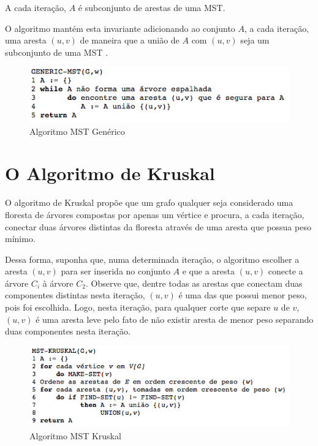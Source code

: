 \documentclass[12pt]{article}
\begin{document}
	A cada iteração, $A$ é subconjunto de arestas de uma MST. 
	
	O algoritmo mantém esta invariante adicionando ao conjunto $A$, a cada iteração, uma aresta $(u,v)$ de maneira que a união de $A$ com $(u,v)$ seja um subconjunto de uma MST \cite{paulo:15}.
\begin{figure}[ht]
    \centering
    \includegraphics[width=1\textwidth]{imagens/generic_mst.png}
    \caption{Algoritmo MST Genérico}
\end{figure}



\section{O Algoritmo de Kruskal}
O algoritmo de Kruskal propõe que um grafo qualquer seja considerado uma floresta de árvores compostas por apenas um vértice e procura, a cada iteração, conectar duas árvores distintas da floresta através de uma aresta que possua peso mínimo.

Dessa forma, suponha que, numa determinada iteração, o algoritmo escolher a aresta $(u,v)$ para ser inserida no conjunto $A$ e que a aresta $(u,v)$ conecte a árvore $C_i$ à árvore $C_2$. Observe que, dentre todas as arestas que conectam duas componentes distintas nesta iteração, $(u,v)$ é uma das que possui menor peso, pois foi escolhida. Logo, nesta iteração, para qualquer corte que separe $u$ de $v$, $(u,v)$ é uma aresta leve pelo fato de não existir aresta de menor peso separando duas componentes nesta iteração.

\begin{figure}[ht]
    \centering
    \includegraphics[width=1\textwidth]{imagens/mst_kruskal.png}
    \caption{Algoritmo MST Kruskal}
    \label{fig:mst_kruskal}
\end{figure}
\end{document}
